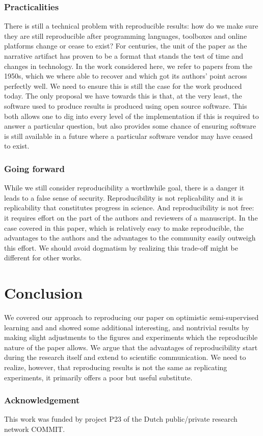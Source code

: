 \documentclass[runningheads,a4paper]{llncs}\usepackage[]{graphicx}\usepackage[]{color}
\begin{document}
\subsubsection{Practicalities}
There is still a technical problem with reproducible results: how do we make sure they are still reproducible after programming languages, toolboxes and online platforms change or cease to exist? For centuries, the unit of the paper as the narrative artifact has proven to be a format that stands the test of time and changes in technology. In the work considered here, we refer to papers from the 1950s, which we where able to recover and which got its authors' point across perfectly well. We need to ensure this is still the case for the work produced today. The only proposal we have towards this is that, at the very least, the software used to produce results is produced using open source software. This both allows one to dig into every level of the implementation if this is required to answer a particular question, but also provides some chance of ensuring software is still available in a future where a particular software vendor may have ceased to exist.

\subsubsection{Going forward}
While we still consider reproducibility a worthwhile goal, there is a danger it leads to a false sense of security. Reproducibility is not replicability and it is replicability that constitutes progress in science. And reproducibility is not free: it requires effort on the part of the authors and reviewers of a manuscript. In the case covered in this paper, which is relatively easy to make reproducible, the advantages to the authors and the advantages to the community easily outweigh this effort. We should avoid dogmatism by realizing this trade-off might be different for other works.

\section{Conclusion}
We covered our approach to reproducing our paper on optimistic semi-supervised learning and and showed some additional interesting, and nontrivial results by making slight adjustments to the figures and experiments which the reproducible nature of the paper allows. We argue that the advantages of reproducibility start during the research itself and extend to scientific communication. We need to realize, however, that reproducing results is not the same as replicating experiments, it primarily offers a poor but useful substitute.

\subsubsection*{Acknowledgement}
This work was funded by project P23 of the Dutch public/private research network COMMIT.



\end{document}
